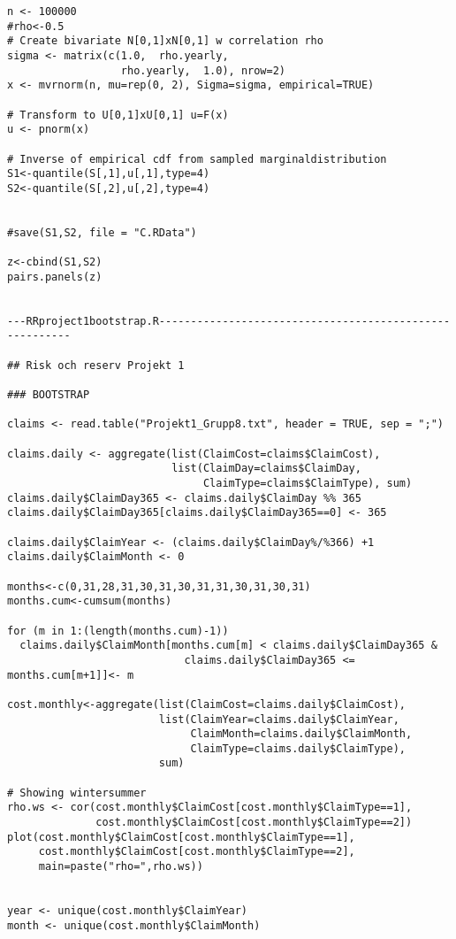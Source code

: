 \documentclass[11pt]{article}
\begin{document}
\begin{verbatim}
n <- 100000
#rho<-0.5
# Create bivariate N[0,1]xN[0,1] w correlation rho
sigma <- matrix(c(1.0,  rho.yearly,
                  rho.yearly,  1.0), nrow=2)
x <- mvrnorm(n, mu=rep(0, 2), Sigma=sigma, empirical=TRUE)

# Transform to U[0,1]xU[0,1] u=F(x)
u <- pnorm(x)

# Inverse of empirical cdf from sampled marginaldistribution 
S1<-quantile(S[,1],u[,1],type=4)
S2<-quantile(S[,2],u[,2],type=4)


#save(S1,S2, file = "C.RData")

z<-cbind(S1,S2)
pairs.panels(z)


---RRproject1bootstrap.R--------------------------------------------------------

## Risk och reserv Projekt 1

### BOOTSTRAP

claims <- read.table("Projekt1_Grupp8.txt", header = TRUE, sep = ";")

claims.daily <- aggregate(list(ClaimCost=claims$ClaimCost),
                          list(ClaimDay=claims$ClaimDay,
                               ClaimType=claims$ClaimType), sum)
claims.daily$ClaimDay365 <- claims.daily$ClaimDay %% 365
claims.daily$ClaimDay365[claims.daily$ClaimDay365==0] <- 365

claims.daily$ClaimYear <- (claims.daily$ClaimDay%/%366) +1
claims.daily$ClaimMonth <- 0

months<-c(0,31,28,31,30,31,30,31,31,30,31,30,31)
months.cum<-cumsum(months)

for (m in 1:(length(months.cum)-1))
  claims.daily$ClaimMonth[months.cum[m] < claims.daily$ClaimDay365 &
                            claims.daily$ClaimDay365 <= months.cum[m+1]]<- m

cost.monthly<-aggregate(list(ClaimCost=claims.daily$ClaimCost),
                        list(ClaimYear=claims.daily$ClaimYear,
                             ClaimMonth=claims.daily$ClaimMonth,
                             ClaimType=claims.daily$ClaimType),
                        sum)

# Showing wintersummer
rho.ws <- cor(cost.monthly$ClaimCost[cost.monthly$ClaimType==1],
              cost.monthly$ClaimCost[cost.monthly$ClaimType==2])
plot(cost.monthly$ClaimCost[cost.monthly$ClaimType==1],
     cost.monthly$ClaimCost[cost.monthly$ClaimType==2],
     main=paste("rho=",rho.ws))


year <- unique(cost.monthly$ClaimYear)
month <- unique(cost.monthly$ClaimMonth)



\end{verbatim}
\end{document}
